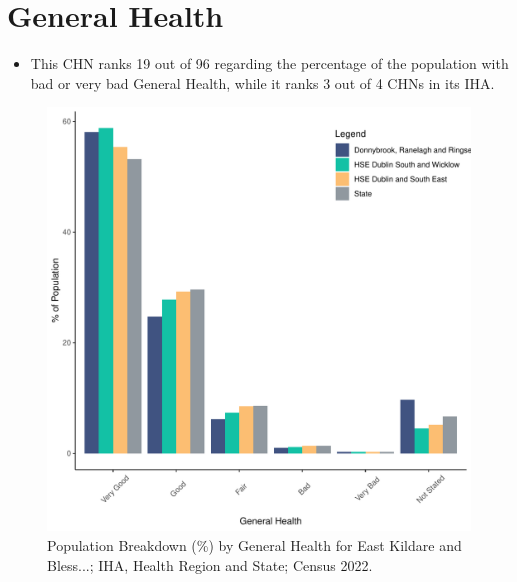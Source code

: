 \documentclass{article}
\begin{document}
\pagebreak

\section{General Health}\label{sect:GenHealth}
\begin{itemize}
\item  This CHN ranks  19 out of 96 regarding the percentage of the population with bad or very bad General Health, while it ranks   3 out of 4 CHNs in its IHA.
\end{itemize}
\begin{figure}[h]
	\centering
	\includegraphics[width = 150mm]{../figures/GenED.pdf}
	\caption{Population Breakdown (\%) by General Health for East Kildare and Bless...; IHA, Health Region and State;  Census 2022.}
	\label{fig:2ae19629-1a6a-13a3-e055-000000000001}
	\end{figure}
\end{document}
